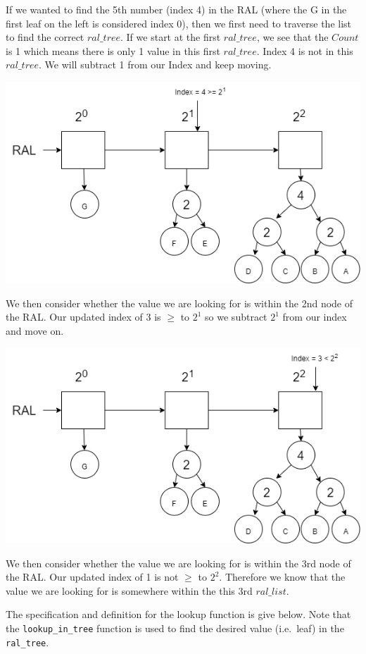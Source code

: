 \documentclass[
]{book}
\begin{document}
If we wanted to find the 5th number (index 4) in the RAL (where the G in the first leaf on the left is considered index 0), then we first need to traverse the list to find the correct \(ral\_tree\). If we start at the first \(ral\_tree\), we see that the \(Count\) is 1 which means there is only 1 value in this first \(ral\_tree\). Index 4 is not in this \(ral\_tree\). We will subtract 1 from our Index and keep moving.

\includegraphics{images/ral7_counting_step2.drawio.png}

We then consider whether the value we are looking for is within the 2nd node of the RAL. Our updated index of 3 is \(\geq\) to \(2^1\) so we subtract \(2^1\) from our index and move on.

\includegraphics{images/ral7_counting_step3.drawio.png}

We then consider whether the value we are looking for is within the 3rd node of the RAL. Our updated index of 1 is not \(\geq\) to \(2^2\). Therefore we know that the value we are looking for is somewhere within the this 3rd \(ral\_list\).

The specification and definition for the lookup function is give below. Note that the \texttt{lookup\_in\_tree} function is used to find the desired value (i.e.~leaf) in the \texttt{ral\_tree}.
\end{document}
